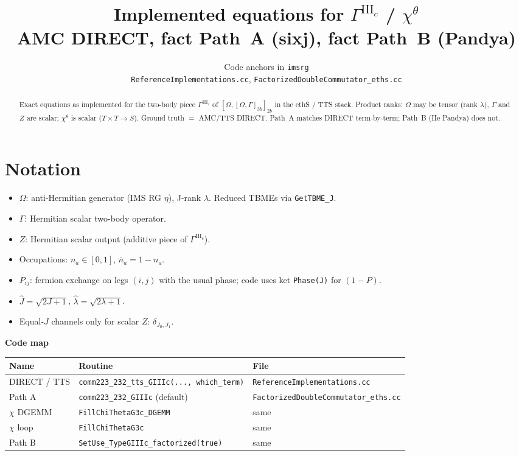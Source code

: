 \documentclass[11pt]{article}
\title{Implemented equations for $\Gamma^{\mathrm{III}_c}$ / $\chi^\theta$\\
\large AMC DIRECT, fact Path~A (sixj), fact Path~B (Pandya)}
\author{Code anchors in \texttt{imsrg}\\
\texttt{ReferenceImplementations.cc}, \texttt{FactorizedDoubleCommutator\_eths.cc}}
\date{}
\newcommand{\Jhat}[1]{\widehat{#1}}
\newcommand{\nbar}{\bar n}
\begin{document}
\maketitle

\begin{abstract}
Exact equations as implemented for the two-body piece $\Gamma^{\mathrm{III}_c}$
of $[\Omega,[\Omega,\Gamma]_{3b}]_{2b}$ in the ethS / TTS stack.
Product ranks: $\Omega$ may be tensor (rank $\lambda$), $\Gamma$ and $Z$ are
scalar; $\chi^\theta$ is scalar ($T\times T\to S$).
Ground truth $=$ AMC/TTS DIRECT. Path~A matches DIRECT term-by-term;
Path~B (IIe Pandya) does not.
\end{abstract}

\tableofcontents

\section{Notation}

\begin{itemize}
  \item $\Omega$: anti-Hermitian generator (IMS RG $\eta$), J-rank $\lambda$.
        Reduced TBMEs via \texttt{GetTBME\_J}.
  \item $\Gamma$: Hermitian scalar two-body operator.
  \item $Z$: Hermitian scalar output (additive piece of $\Gamma^{\mathrm{III}_c}$).
  \item Occupations: $n_a\in[0,1]$, $\nbar_a=1-n_a$.
  \item $P_{ij}$: fermion exchange on legs $(i,j)$ with the usual phase;
        code uses ket \texttt{Phase(J)} for $(1-P)$.
  \item $\Jhat{J}=\sqrt{2J+1}$, $\hat\lambda=\sqrt{2\lambda+1}$.
  \item Equal-$J$ channels only for scalar $Z$: $\delta_{J_0,J_1}$.
\end{itemize}

\textbf{Code map}
\begin{center}
\begin{tabular}{@{}lll@{}}
\toprule
Name & Routine & File \\
\midrule
DIRECT / TTS & \texttt{comm223\_232\_tts\_GIIIc(..., which\_term)} & \texttt{ReferenceImplementations.cc} \\
Path A & \texttt{comm223\_232\_GIIIc} (default) & \texttt{FactorizedDoubleCommutator\_eths.cc} \\
$\chi$ DGEMM & \texttt{FillChiThetaG3c\_DGEMM} & same \\
$\chi$ loop & \texttt{FillChiThetaG3c} & same \\
Path B & \texttt{SetUse\_TypeGIIIc\_factorized(true)} & same \\
\bottomrule
\end{tabular}
\end{center}
\end{document}
